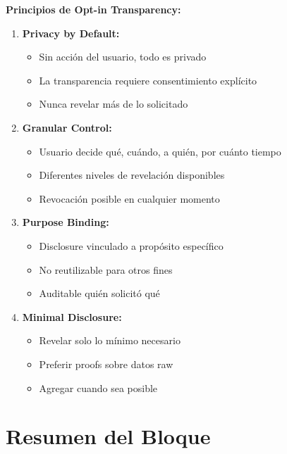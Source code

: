 \documentclass[11pt,a4paper,twoside]{book}
\theoremstyle{definition}
\theoremstyle{remark}
\begin{document}
\begin{keyidea}
\textbf{Principios de Opt-in Transparency:}

\begin{enumerate}
    \item \textbf{Privacy by Default:}
    \begin{itemize}
        \item Sin acción del usuario, todo es privado
        \item La transparencia requiere consentimiento explícito
        \item Nunca revelar más de lo solicitado
    \end{itemize}
    
    \item \textbf{Granular Control:}
    \begin{itemize}
        \item Usuario decide qué, cuándo, a quién, por cuánto tiempo
        \item Diferentes niveles de revelación disponibles
        \item Revocación posible en cualquier momento
    \end{itemize}
    
    \item \textbf{Purpose Binding:}
    \begin{itemize}
        \item Disclosure vinculado a propósito específico
        \item No reutilizable para otros fines
        \item Auditable quién solicitó qué
    \end{itemize}
    
    \item \textbf{Minimal Disclosure:}
    \begin{itemize}
        \item Revelar solo lo mínimo necesario
        \item Preferir proofs sobre datos raw
        \item Agregar cuando sea posible
    \end{itemize}
\end{enumerate}
\end{keyidea}

\section*{Resumen del Bloque}
\end{document}
